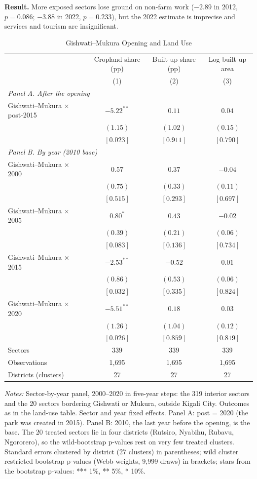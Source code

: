 \documentclass[11pt]{article}
\begin{document}
\textbf{Result.} More exposed sectors lose ground on non-farm work ($-$2.89 in 2012, $p=0.086$; $-$3.88 in 2022, $p=0.233$), but the 2022 estimate is imprecise and services and tourism are insignificant.
\clearpage
\begin{table}[H]
\centering\small\setlength{\tabcolsep}{4pt}
\caption{Gishwati--Mukura Opening and Land Use}
\label{tab:open_land}
\begin{tabular}{lccc}
\toprule
 & Cropland share (pp) & Built-up share (pp) & Log built-up area \\
 & (1) & (2) & (3) \\
\midrule
\multicolumn{4}{l}{\textit{Panel A. After the opening}} \\
Gishwati--Mukura $\times$ post-2015 & $-5.22^{**}$ & $0.11$ & $0.04$ \\
 & $(1.15)$ & $(1.02)$ & $(0.15)$ \\
 & $[0.023]$ & $[0.911]$ & $[0.790]$ \\
\multicolumn{4}{l}{\textit{Panel B. By year (2010 base)}} \\
Gishwati--Mukura $\times$ 2000 & $0.57$ & $0.37$ & $-0.04$ \\
 & $(0.75)$ & $(0.33)$ & $(0.11)$ \\
 & $[0.515]$ & $[0.293]$ & $[0.697]$ \\
Gishwati--Mukura $\times$ 2005 & $0.80^{*}$ & $0.43$ & $-0.02$ \\
 & $(0.39)$ & $(0.21)$ & $(0.06)$ \\
 & $[0.083]$ & $[0.136]$ & $[0.734]$ \\
Gishwati--Mukura $\times$ 2015 & $-2.53^{**}$ & $-0.52$ & $0.01$ \\
 & $(0.86)$ & $(0.53)$ & $(0.06)$ \\
 & $[0.032]$ & $[0.335]$ & $[0.824]$ \\
Gishwati--Mukura $\times$ 2020 & $-5.51^{**}$ & $0.18$ & $0.03$ \\
 & $(1.26)$ & $(1.04)$ & $(0.12)$ \\
 & $[0.026]$ & $[0.859]$ & $[0.819]$ \\
\midrule
Sectors & 339 & 339 & 339 \\
Observations & 1,695 & 1,695 & 1,695 \\
Districts (clusters) & 27 & 27 & 27 \\
\bottomrule
\end{tabular}
\begin{minipage}{0.95\textwidth}\footnotesize
\textit{Notes:} Sector-by-year panel, 2000--2020 in five-year steps: the 319 interior sectors and the 20 sectors bordering Gishwati or Mukura, outside Kigali City. Outcomes as in the land-use table. Sector and year fixed effects. Panel A: post = 2020 (the park was created in 2015). Panel B: 2010, the last year before the opening, is the base. The 20 treated sectors lie in four districts (Rutsiro, Nyabihu, Rubavu, Ngororero), so the wild-bootstrap p-values rest on very few treated clusters. Standard errors clustered by district (27 clusters) in parentheses; wild cluster restricted bootstrap p-values (Webb weights, 9,999 draws) in brackets; stars from the bootstrap p-values: *** 1\%, ** 5\%, * 10\%.
\end{minipage}
\end{table}
\end{document}
